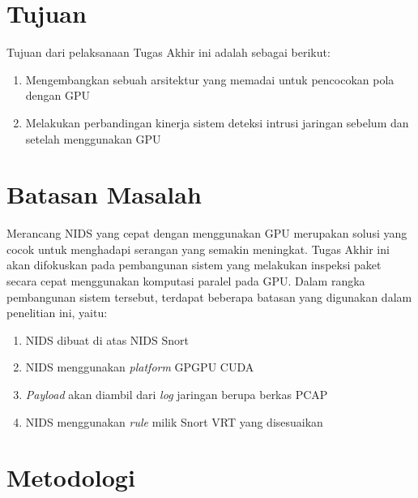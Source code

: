 \section{Tujuan}

  Tujuan dari pelaksanaan Tugas Akhir ini adalah sebagai berikut:
  \begin{enumerate}
      \item Mengembangkan sebuah arsitektur yang memadai untuk pencocokan pola dengan GPU
      \item Melakukan perbandingan kinerja sistem deteksi intrusi jaringan sebelum dan setelah menggunakan GPU
  \end{enumerate}

\section{Batasan Masalah}

  Merancang NIDS yang cepat dengan menggunakan GPU merupakan solusi yang cocok untuk menghadapi serangan yang semakin meningkat. Tugas Akhir ini akan difokuskan pada pembangunan sistem yang melakukan inspeksi paket secara cepat menggunakan komputasi paralel pada GPU. Dalam rangka pembangunan sistem tersebut, terdapat beberapa batasan yang digunakan dalam penelitian ini, yaitu:
  \begin{enumerate}
      \item NIDS dibuat di atas NIDS Snort
      \item NIDS menggunakan \emph{platform} GPGPU CUDA
      \item \emph{Payload} akan diambil dari \emph{log} jaringan berupa berkas PCAP
      \item NIDS menggunakan \emph{rule} milik Snort VRT yang disesuaikan
  \end{enumerate}

\section{Metodologi}

